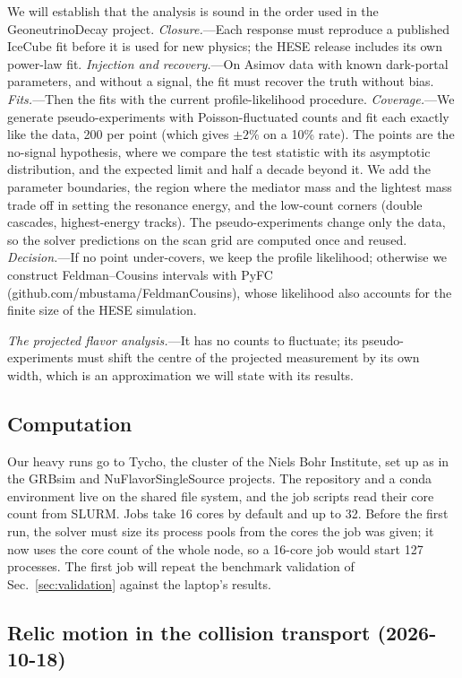 \documentclass[11pt,a4paper]{article}
\begin{document}
We will establish that the analysis is sound in the order used in the GeoneutrinoDecay
project. \textit{Closure.}---Each response must reproduce a published IceCube fit before it
is used for new physics; the HESE release includes its own power-law fit. \textit{Injection
and recovery.}---On Asimov data with known dark-portal parameters, and without a signal, the fit
must recover the truth without bias. \textit{Fits.}---Then the fits with the current
profile-likelihood procedure. \textit{Coverage.}---We generate pseudo-experiments with
Poisson-fluctuated counts and fit each exactly like the data, 200 per point (which gives
$\pm2\%$ on a 10\% rate). The points are the no-signal hypothesis, where we compare the test
statistic with its asymptotic distribution, and the expected limit and half a decade beyond it.
We add the parameter boundaries, the region where the mediator mass and the lightest mass trade
off in setting the resonance energy, and the low-count corners (double cascades,
highest-energy tracks). The pseudo-experiments change only
the data, so the solver predictions on the scan grid are computed once and reused.
\textit{Decision.}---If no point under-covers, we keep the profile likelihood; otherwise we
construct Feldman--Cousins intervals with PyFC (github.com/mbustama/FeldmanCousins), whose
likelihood also accounts for the finite size of the HESE simulation.

\textit{The projected flavor analysis.}---It has no counts to fluctuate; its
pseudo-experiments must shift the centre of the projected measurement by its own width, which
is an approximation we will state with its results.

\subsection{Computation}

Our heavy runs go to Tycho, the cluster of the Niels Bohr Institute, set up as in the GRBsim and
NuFlavorSingleSource projects. The repository and a conda environment live on the shared file
system, and the job scripts read their core count from SLURM. Jobs take 16 cores by default and
up to 32. Before the first run, the solver must size its process pools from the cores the job was
given; it now uses the core count of the whole node, so a 16-core job would start 127
processes. The first job will repeat the benchmark validation of Sec.~\ref{sec:validation}
against the laptop's results.

\subsection{Relic motion in the collision transport (2026-10-18)}
\label{sec:relic-motion}
\end{document}
